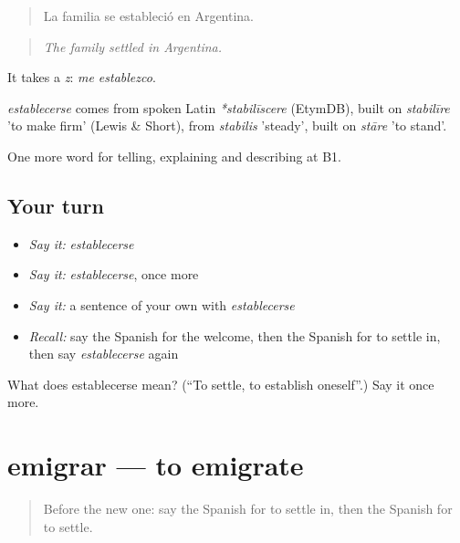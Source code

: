 \begin{quote}
La familia se estableció en Argentina.
\end{quote}

\begin{quote}
\emph{The family settled in Argentina.}
\end{quote}

It takes a \emph{z}: \emph{me establezco}.

\begin{cousinweb}
\emph{establecerse} comes from spoken Latin \emph{*stabilīscere} (EtymDB), built on \emph{stabilīre} 'to make firm' (Lewis \& Short), from \emph{stabilis} 'steady', built on \emph{stāre} 'to stand'.
\end{cousinweb}

\begin{grammarlens}[title={What you've built}]
One more word for telling, explaining and describing at B1.
\end{grammarlens}

\subsection*{Your turn}
\begin{itemize}
\raggedright
  \item \emph{Say it:} \emph{establecerse}
  \item \emph{Say it:} \emph{establecerse}, once more
  \item \emph{Say it:} a sentence of your own with \emph{establecerse}
  \item \emph{Recall:} say the Spanish for the welcome, then the Spanish for to settle in, then say \emph{establecerse} again
\end{itemize}

\begin{tcolorbox}[breakable,colback=teal!4,colframe=teal!35!black,title={Before you move on}]
What does establecerse mean? (\textquotedblleft{}To settle, to establish oneself\textquotedblright{}.) Say it once more.
\end{tcolorbox}
\section[emigrar]{emigrar — to emigrate}

\label{lesson:ES-C551-emigrar}



\begin{quote}
Before the new one: say the Spanish for to settle in, then the Spanish for to settle.
\end{quote}

